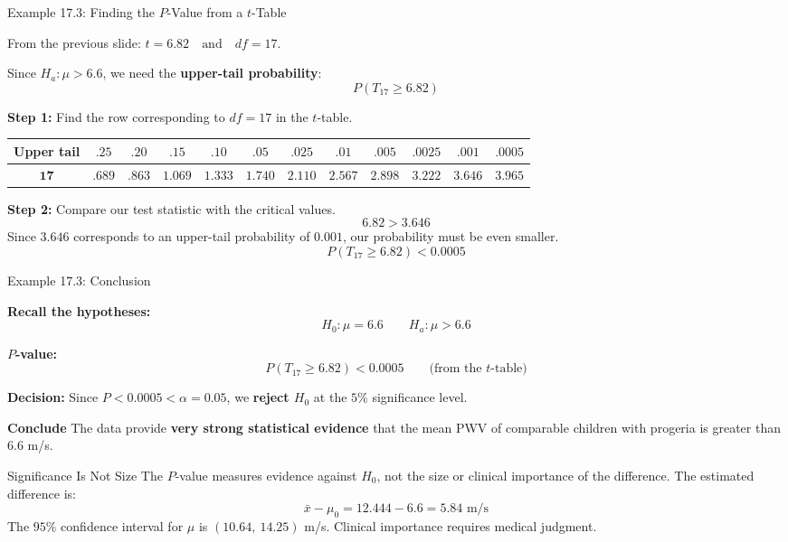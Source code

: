 \documentclass[aspectratio=169,10pt]{beamer}
\newcommand{\step}[1]{\textcolor{CourseBlue}{\textbf{#1}}\quad}
\begin{document}
\begin{frame}{Example 17.3: Finding the $P$-Value from a $t$-Table}

\small
From the previous slide: $t=6.82 \quad  \text{and} \quad df=17$.

Since $H_a:\mu>6.6$, we need the \textbf{upper-tail probability}:
$$P(T_{17}\ge 6.82)$$

\vspace{0.15cm}
\textbf{Step 1:} Find the row corresponding to $df=17$ in the $t$-table.
\begin{center}
\scriptsize
\setlength{\tabcolsep}{3.2pt}
\renewcommand{\arraystretch}{1.4}
\begin{tabular}{c|ccccccccccc}
\toprule
\textbf{Upper tail}
& $.25$ & $.20$ & $.15$ & $.10$ & $.05$
& $.025$ & $.01$ & $.005$ & $.0025$
& $.001$ & $\mathbf{.0005}$ \\
\midrule
$\mathbf{17}$
& $.689$ & $.863$ & $1.069$ & $1.333$
& $1.740$ & $2.110$ & $2.567$ & $2.898$
& $3.222$ & $3.646$ & $\mathbf{3.965}$ \\
\bottomrule
\end{tabular}
\end{center}

\vspace{0.15cm}
\textbf{Step 2:} Compare our test statistic with the critical values.
$$6.82>3.646$$
Since $3.646$ corresponds to an upper-tail probability of $0.001$, our probability must be even smaller.
$$\boxed{P(T_{17}\ge 6.82)<0.0005}$$
\end{frame}

\begin{frame}{Example 17.3: Conclusion}

\small
\textbf{Recall the hypotheses:}
$$H_0:\mu=6.6 \qquad H_a:\mu>6.6$$

\vspace{0.1cm}
\textbf{$P$-value:}
$$\boxed{P(T_{17}\ge 6.82)<0.0005} \qquad \text{(from the $t$-table)}$$


\vspace{0.05cm}
\textbf{Decision:} Since $P<0.0005<\alpha=0.05$, we \textbf{reject $H_0$} at the $5\%$ significance level.

\vspace{0.1cm}
\step{Conclude} The data provide \textbf{very strong statistical evidence} that the mean PWV of comparable children with progeria is greater than $6.6$ m/s.

\vspace{0.2cm}
\begin{block}{Significance Is Not Size}
The $P$-value measures evidence against $H_0$, not the size or clinical importance of the difference. The estimated difference is:
$$\bar{x}-\mu_0=12.444-6.6=\boxed{5.84\text{ m/s}}$$
The $95\%$ confidence interval for $\mu$ is $(10.64,\ 14.25)$ m/s. Clinical importance requires medical judgment.
\end{block}
\end{frame}
\end{document}
